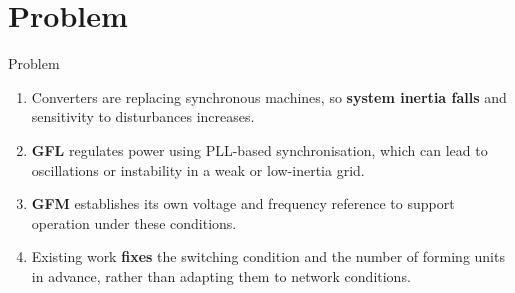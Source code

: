 \documentclass{beamer}
\begin{document}
\section{Problem}
\begin{frame}{Problem}
\vspace{0.45cm}
\large
\begin{enumerate}\setlength{\itemsep}{0.42cm}
  \item Converters are replacing synchronous machines, so \textbf{system inertia
        falls} and sensitivity to disturbances increases.
  \item \textbf{GFL} regulates power using PLL-based synchronisation, which can
        lead to oscillations or instability in a weak or low-inertia grid.
  \item \textbf{GFM} establishes its own voltage and frequency reference to support
        operation under these conditions.
  \item Existing work \textbf{fixes} the switching condition and the number of
        forming units in advance, rather than adapting them to network conditions.
\end{enumerate}
\end{frame}

%
%
\end{document}
